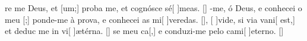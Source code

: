 {  %
  {re me Deus, et [um;] proba me, et cognósce sé[ ]{me}as. [\LinkLA]}%
    {-me, ó Deus, e conhecei o meu [;] pon\-de-me à prova, e conhecei as mi[ ]{ve}{re}das. [\LinkPT]},
  {[ ]{vi}de, si via vani[ est,] et deduc me in vi[ ]{æ}{tér}na. [\LinkLA]}%
    { se meu ca[,] e conduzi-me pelo cami[ ]{e}{ter}no. [\LinkPT]}
}